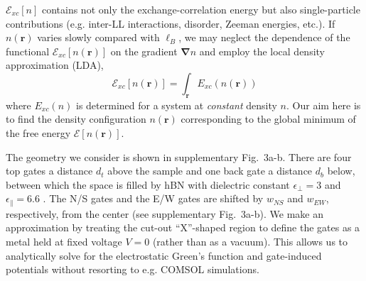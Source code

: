 \documentclass[reprint,prl,aps,superscriptaddress]{revtex4-1}
\begin{document}
$\mathcal{E}_{xc}[n]$ contains not only the exchange-correlation energy but also single-particle contributions (e.g. inter-LL interactions, disorder, Zeeman energies, etc.). If $n(\mathbf{r})$ varies slowly compared with $\ell_{B}$, we may neglect the dependence of the functional $\mathcal{E}_{xc}[n(\mathbf{r})]$ on the gradient $\boldsymbol{\nabla} n$ and employ the local density approximation (LDA),
\begin{equation}
    \mathcal{E}_{xc}[n(\mathbf{r})] = \int_{\mathbf{r}} E_{xc}(n(\mathbf{r}))
\end{equation}
where $E_{xc}(n)$ is determined for a system at \textit{constant} density $n$.
Our aim here is to find the density configuration $n(\mathbf{r})$ corresponding to the global minimum of the free energy $\mathcal{E}[n(\mathbf{r})]$.

The geometry we consider is shown in supplementary Fig.~3a-b.
There are four top gates a distance $d_t$ above the sample and one back gate a distance $d_b$ below, between which the space is filled by hBN with dielectric constant $\epsilon_{\perp} = 3$ and $\epsilon_{\|} = 6.6$ \cite{laturia_dielectric_2018}.
The N/S gates and the E/W gates are shifted by $w_{NS}$ and $w_{EW}$, respectively, from the center (see supplementary Fig.~3a-b).
We make an approximation by treating the cut-out ``X''-shaped region to define the gates as  a metal held at fixed voltage $V=0$ (rather than as a vacuum). 
This allows us to analytically solve for the electrostatic Green's function and gate-induced potentials without resorting to e.g. COMSOL simulations.
\end{document}

